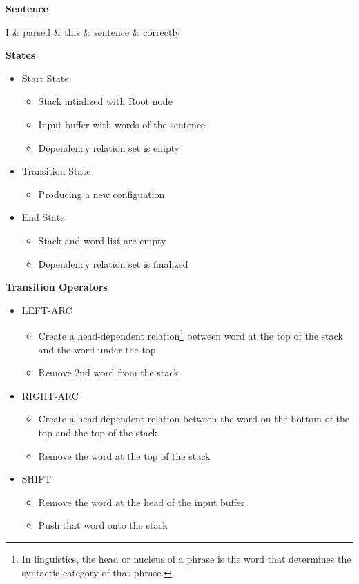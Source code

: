 \textbf{Sentence}
\begin{center}
\begin{dependency}
	\begin{deptext}[column sep=0.2cm]
      I \& parsed \& this \& sentence \& correctly \\
   \end{deptext}
\end{dependency}
\end{center}
\textbf{States}
\begin{itemize}
	\item Start State
		\begin{itemize}
			\item Stack intialized with Root node
			\item Input buffer with words of the sentence
			\item Dependency relation set is empty
		\end{itemize}
	\item Transition State
		\begin{itemize}
			\item Producing a new configuation
		\end{itemize}
	\item End State
		\begin{itemize}
			\item Stack and word list are empty
			\item Dependency relation set is finalized
		\end{itemize}
\end{itemize}
\textbf{Transition Operators}
\begin{itemize}
	\item LEFT-ARC
		\begin{itemize}
			\item Create a head-dependent relation\footnote{In linguistics, the head or nucleus of a phrase is the word that determines the syntactic category of that phrase.} between word at the top of the stack and the word under the top.
			\item Remove 2nd word from the stack
		\end{itemize}
	\item RIGHT-ARC
		\begin{itemize}
			\item Create a head dependent relation between the word on the bottom of the top and the top of the stack.
			\item Remove the word at the top of the stack
		\end{itemize}
	\item SHIFT
		\begin{itemize}
			\item Remove the word at the head of the input buffer.
			\item Push that word onto the stack 
		\end{itemize}
\end{itemize}
